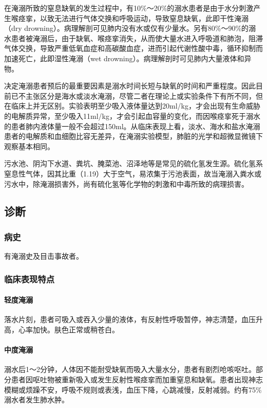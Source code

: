 在淹溺所致的窒息缺氧的发生过程中，有10\%～20\%的溺水患者是由于水分刺激产生喉痉挛，以致无法进行气体交换和呼吸运动，导致窒息缺氧，此即干性淹溺（dry
drowning）。病理解剖可见肺内没有水或仅有少量水。另有80\%～90\%的溺水患者被淹溺后，由于缺氧、喉痉挛消失，从而使大量水进入呼吸道和肺泡，阻滞气体交换，导致严重低氧血症和高碳酸血症，进而引起代谢性酸中毒，循环抑制而加速死亡，此即湿性淹溺（wet
drowning）。病理解剖时可见肺内大量液体和异物。

决定淹溺患者预后的最重要因素是溺水时间长短与缺氧的时间和严重程度。因此目前已不主张区分是海水或淡水淹溺，尽管二者在理论上或实验条件下有所不同，但在临床上并无区别。实验表明至少吸入液体量达到20ml/kg，才会出现有生命威胁的电解质异常，至少吸入11ml/kg，才会引起血容量的变化，而因喉痉挛死于溺水的患者肺内液体量一般不会超过150ml。从临床表现上看，淡水、海水和盐水淹溺患者的电解质和血细胞比容无差异，在淹溺实验模型，肺脏的光学和超微显微镜下观察基本相同。

污水池、阴沟下水道、粪坑、腌菜池、沼泽地等是常见的硫化氢发生源。硫化氢系窒息性气体，因其比重（1.19）大于空气，易浓集于污池表面，故当淹溺入粪水或污水中，除淹溺损害外，尚有硫化氢等化学物的刺激和中毒所致的病理损害。

\subsection{诊断}

\subsubsection{病史}

有淹溺史及目击事故者。

\subsubsection{临床表现特点}

\paragraph{轻度淹溺}

落水片刻，患者可吸入或吞入少量的液体，有反射性呼吸暂停，神志清楚，血压升高，心率加快。肤色正常或稍苍白。

\paragraph{中度淹溺}

溺水后1～2分钟，人体因不能耐受缺氧而吸入大量水分，患者有剧烈呛咳呕吐。部分患者因呕吐物被重新吸入或发生反射性喉痉挛而加重窒息和缺氧。患者出现神志模糊或烦躁不安，呼吸不规则或表浅，血压下降，心跳减慢，反射减弱。约有75\%溺水者发生肺水肿。

